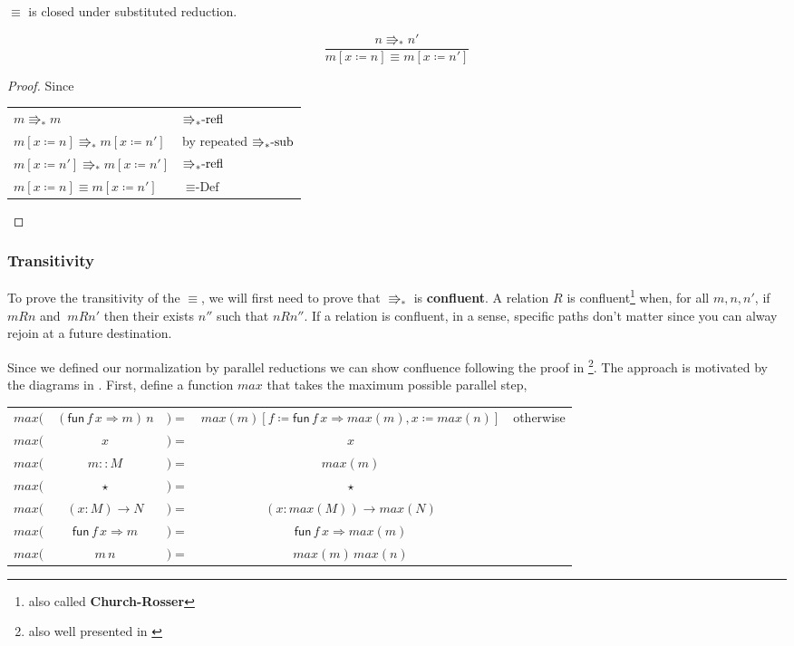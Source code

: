 \begin{cor}
$\equiv$ is closed under substituted reduction.
\end{cor}

\[
\frac{n\Rrightarrow_{\ast}n'}{m\left[x\coloneqq n\right]\equiv m\left[x\coloneqq n'\right]}
\]

\begin{proof}
Since

\begin{tabular}{ll}
$m\Rrightarrow_{\ast}m$ & $\textrm{\ensuremath{\Rrightarrow_{\ast}}-refl}$\tabularnewline
$m\left[x\coloneqq n\right]\Rrightarrow_{\ast}m\left[x\coloneqq n'\right]$ & by repeated $\textrm{\ensuremath{\Rrightarrow_{\ast}}-sub}$\tabularnewline
$m\left[x\coloneqq n'\right]\Rrightarrow_{\ast}m\left[x\coloneqq n'\right]$ & $\textrm{\ensuremath{\Rrightarrow_{\ast}}-refl}$\tabularnewline
$m\left[x\coloneqq n\right]\equiv m\left[x\coloneqq n'\right]$ & $\equiv\textrm{-Def}$\tabularnewline
\end{tabular}
\end{proof}

\subsubsection{Transitivity}

To prove the transitivity of the $\equiv$, we will first need to prove that \textbf{$\Rrightarrow_{\ast}$ }is \textbf{confluent}.
A relation $R$ is confluent\footnote{also called \textbf{Church-Rosser}} when, for all $m,n,n'$, if $mRn$ and $\:mRn'$ then their exists $n''$ such that $nRn''$. %
If a relation is confluent, in a sense, specific paths don't matter since you can alway rejoin at a future destination.

Since we defined our normalization by parallel reductions we can show confluence following the proof in \cite{TAKAHASHI1995120}\footnote{also well presented in \cite{KOKKE2020102440}}.
The approach is motivated by the diagrams in .
First, define a function $max$ that takes the maximum possible parallel step, %

\begin{tabular}{ccccc}
$max($ & $\left(\mathsf{fun}\,f\,x\Rightarrow m\right)\,n$ & $)=$ & $max\left(m\right)\left[f\coloneqq\mathsf{fun}\,f\,x\Rightarrow max\left(m\right),x\coloneqq max\left(n\right)\right]$ & otherwise\tabularnewline
$max($ & $x$ & $)=$ & $x$ & \tabularnewline
$max($ & $m::M$ & $)=$ & $max\left(m\right)$ & \tabularnewline
$max($ & $\star$ & $)=$ & $\star$ & \tabularnewline
$max($ & $\left(x:M\right)\rightarrow N$ & $)=$ & $\left(x:max\left(M\right)\right)\rightarrow max\left(N\right)$ & \tabularnewline
$max($ & $\mathsf{fun}\,f\,x\Rightarrow m$ & $)=$ & $\mathsf{fun}\,f\,x\Rightarrow max\left(m\right)$ & \tabularnewline
$max($ & $m\,n$ & $)=$ & $max\left(m\right)\,max\left(n\right)$ & \tabularnewline
\end{tabular}


